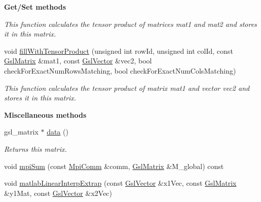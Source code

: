 \begin{Indent}{\bf Get/\-Set methods}
\begin{DoxyCompactItemize}
\begin{DoxyCompactList}\small\item\em This function calculates the tensor product of matrices {\ttfamily mat1} and {\ttfamily mat2} and stores it in {\ttfamily this} matrix. \end{DoxyCompactList}\item 
void \hyperlink{class_q_u_e_s_o_1_1_gsl_matrix_ace504579eee66b2b65adeb1506468bb9}{fill\-With\-Tensor\-Product} (unsigned int row\-Id, unsigned int col\-Id, const \hyperlink{class_q_u_e_s_o_1_1_gsl_matrix}{Gsl\-Matrix} \&mat1, const \hyperlink{class_q_u_e_s_o_1_1_gsl_vector}{Gsl\-Vector} \&vec2, bool check\-For\-Exact\-Num\-Rows\-Matching, bool check\-For\-Exact\-Num\-Cols\-Matching)
\begin{DoxyCompactList}\small\item\em This function calculates the tensor product of matrix {\ttfamily mat1} and vector {\ttfamily vec2} and stores it in {\ttfamily this} matrix. \end{DoxyCompactList}\end{DoxyCompactItemize}
\end{Indent}
\begin{Indent}{\bf Miscellaneous methods}\par
\begin{DoxyCompactItemize}
\item 
gsl\-\_\-matrix $\ast$ \hyperlink{class_q_u_e_s_o_1_1_gsl_matrix_a4457fa070f872987233806347c61e6bd}{data} ()
\begin{DoxyCompactList}\small\item\em Returns {\ttfamily this} matrix. \end{DoxyCompactList}\item 
void \hyperlink{class_q_u_e_s_o_1_1_gsl_matrix_a9f310ef75cc6d10127f76ea066f58a4d}{mpi\-Sum} (const \hyperlink{class_q_u_e_s_o_1_1_mpi_comm}{Mpi\-Comm} \&comm, \hyperlink{class_q_u_e_s_o_1_1_gsl_matrix}{Gsl\-Matrix} \&M\-\_\-global) const 
\item 
void \hyperlink{class_q_u_e_s_o_1_1_gsl_matrix_a640bd42b08a74ce6e7cd662133cbcb60}{matlab\-Linear\-Interp\-Extrap} (const \hyperlink{class_q_u_e_s_o_1_1_gsl_vector}{Gsl\-Vector} \&x1\-Vec, const \hyperlink{class_q_u_e_s_o_1_1_gsl_matrix}{Gsl\-Matrix} \&y1\-Mat, const \hyperlink{class_q_u_e_s_o_1_1_gsl_vector}{Gsl\-Vector} \&x2\-Vec)
\end{DoxyCompactItemize}
\end{Indent}
